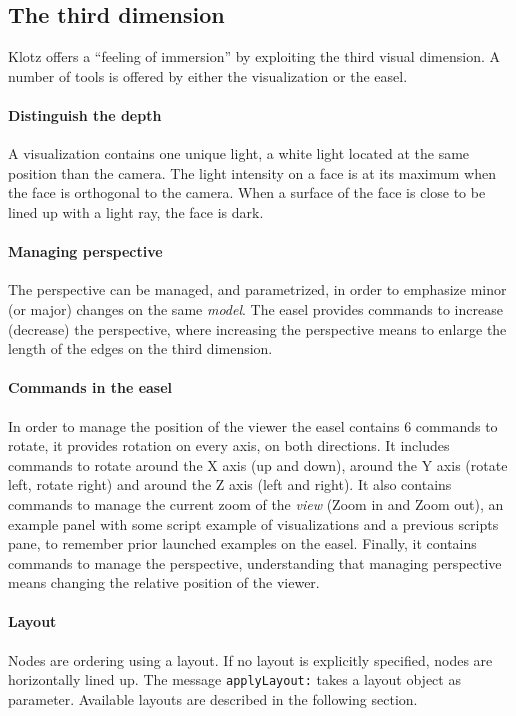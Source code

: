 \documentclass{sig-alternate}
\newcommand{\ct}{\lstinline[backgroundcolor=\color{white},basicstyle=\footnotesize\ttfamily]}
\newcommand{\seclabel}[1]{\label{sec:#1}}
\begin{document}

\subsection{The third dimension} \seclabel{3d}

Klotz offers a ``feeling of immersion'' by exploiting the third visual dimension. A number of tools is offered by either the visualization or the easel.

\paragraph{Distinguish the depth}
A visualization contains one unique light, a white light located at the same position than the camera. The light intensity on a face is at its maximum when the face is orthogonal to the camera. When a surface of the face is close to be lined up with a light ray, the face is dark.

\paragraph{Managing perspective}
The perspective can be managed, and parametrized,
in order to emphasize minor (or major) changes on the same
\emph{model}. The easel provides commands to increase 
(decrease) the perspective, where increasing the
perspective means to enlarge the length of the edges on the
third dimension. 

\paragraph{Commands in the easel}
In order to manage the position of the viewer the easel 
contains 6 commands to rotate, it provides rotation on 
every axis, on both directions. It includes commands
to rotate around the X axis (up and down), around the
Y axis (rotate left, rotate right) and around the Z axis
(left and right). It also contains commands to manage
the current zoom of the \emph{view} (Zoom in and Zoom out),
an example panel with some script example of visualizations
and a previous scripts pane, to remember prior launched examples
on the easel. Finally, it contains commands to manage the 
perspective, understanding that managing perspective means
changing the relative position of the viewer.  
   

\paragraph{Layout}
Nodes are ordering using a layout. If no layout is explicitly specified, nodes are horizontally lined up. The message \ct{applyLayout:} takes a layout object as parameter. Available layouts are described in the following section.
\end{document}
